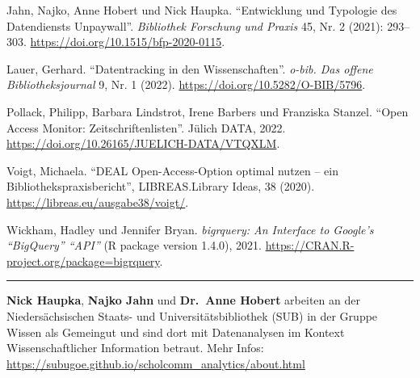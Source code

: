 \documentclass[a4paper,
fontsize=11pt,
oneside,
numbers=noperiodatend,
parskip=half-,
bibliography=totoc,
final
]{scrartcl}
\begin{document}
Jahn, Najko, Anne Hobert und Nick Haupka. \enquote{Entwicklung und
Typologie des Datendiensts Unpaywall}. \emph{Bibliothek Forschung und
Praxis} 45, Nr. 2 (2021): 293--303.
\url{https://doi.org/10.1515/bfp-2020-0115}.

Lauer, Gerhard. \enquote{Datentracking in den Wissenschaften}.
\emph{o-bib. Das offene Bibliotheksjournal} 9, Nr. 1 (2022).
\url{https://doi.org/10.5282/O-BIB/5796}.

Pollack, Philipp, Barbara Lindstrot, Irene Barbers und Franziska
Stanzel. \enquote{Open Access Monitor: Zeitschriftenlisten}. Jülich
DATA, 2022. \url{https://doi.org/10.26165/JUELICH-DATA/VTQXLM}.

Voigt, Michaela. \enquote{DEAL Open-Access-Option optimal nutzen -- ein
Bibliothekspraxisbericht}, LIBREAS.Library Ideas, 38 (2020).
\url{https://libreas.eu/ausgabe38/voigt/}.

Wickham, Hadley und Jennifer Bryan. \emph{bigrquery: An Interface to
Google's \enquote{BigQuery} \enquote{API}} (R package version 1.4.0),
2021.
\href{https://cran.r-project.org/package=bigrquery}{https://CRAN.R-project.org/package=bigrquery}.

\begin{center}\rule{0.5\linewidth}{0.5pt}\end{center}

\textbf{Nick Haupka}, \textbf{Najko Jahn} und \textbf{Dr.~Anne Hobert}
arbeiten an der Niedersächsischen Staats- und Universitätsbibliothek
(SUB) in der Gruppe Wissen als Gemeingut und sind dort mit Datenanalysen
im Kontext Wissenschaftlicher Information betraut. Mehr Infos:
\url{https://subugoe.github.io/scholcomm_analytics/about.html}
\end{document}
